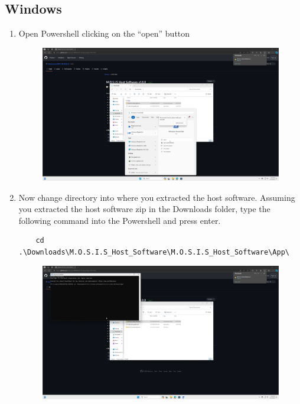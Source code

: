 \documentclass[12pt]{article}
\begin{document}
\begin{center}
	\subsection{Windows}
	\begin{enumerate}
		\item Open Powershell clicking on the ``open'' button
		      \begin{figure}[H]
			      \includegraphics[width=\textwidth]{Figures/Windows-Open-Powershell.png}
		      \end{figure}
		\item Now change directory into where you extracted the host software. Assuming you extracted the host software zip in the Downloads folder, type the following command into the Powershell and press enter.
		      \small\begin{verbatim}
    cd .\Downloads\M.O.S.I.S_Host_Software\M.O.S.I.S_Host_Software\App\
  \end{verbatim}
		      \normalsize
		      \begin{figure}[H]
			      \includegraphics[width=\textwidth]{Figures/Windows-cd-Into-Host-Software.png}

\end{figure}
\end{enumerate}
\end{center}
\end{document}
